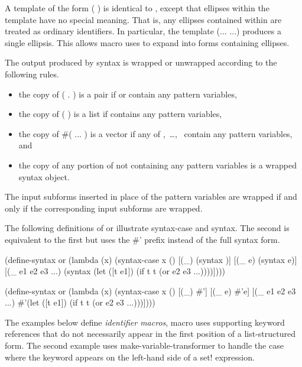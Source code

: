 \begin{entry}{%
}
A template of the form
{\cf ( )} is identical to , except that
ellipses within the template have no special meaning.
That is, any ellipses contained within  are
treated as ordinary identifiers.
In particular, the template {\cf (... ...)} produces a single
ellipsis.
This allows macro uses to expand into forms containing
ellipses.

\label{wrappingrules}
The output produced by {\cf syntax} is wrapped or unwrapped according to
the following rules.

\begin{itemize}
\item the copy of {\cf ( .  )} is a pair if 
      or  contain any pattern variables,
\item the copy of {\cf ( )} is a list if 
      contains any pattern variables,
\item the copy of {\cf \#( ... )} is a vector if any of
      ,~\dots,~ contain any pattern variables, and
\item the copy of any portion of  not containing any pattern variables
      is a wrapped syntax object.
\end{itemize}

The input subforms inserted in place of the pattern variables are wrapped
if and only if the corresponding input subforms are wrapped.
\end{entry}

The following definitions of {\cf or} illustrate {\cf syntax-case}
and {\cf syntax}.
The second is equivalent to the first but uses the {\cf \#'}
prefix instead of the full {\cf syntax} form.

\begin{schemenoindent}
(define-syntax or
  (lambda (x)
    (syntax-case x ()
      [(\_) (syntax \schfalse{})]
      [(\_ e) (syntax e)]
      [(\_ e1 e2 e3 ...)
       (syntax (let ([t e1])
                 (if t t (or e2 e3 ...))))])))

(define-syntax or
  (lambda (x)
    (syntax-case x ()
      [(\_) \#'\schfalse{}]
      [(\_ e) \#'e]
      [(\_ e1 e2 e3 ...)
       \#'(let ([t e1])
           (if t t (or e2 e3 ...)))])))%
\end{schemenoindent}

The examples below define \emph{identifier macros}, macro uses
supporting keyword references that do not necessarily appear in the first
position of a list-structured form.
The second example uses {\cf make-variable-transformer} to handle the case
where the keyword appears on the left-hand side of a
{\cf set!} expression.


